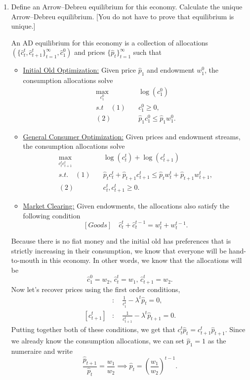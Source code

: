 \documentclass[11pt,english]{article}
\begin{document}
\begin{enumerate}
    \item[a.] Define an Arrow--Debreu equilibrium for this economy. Calculate
        the unique Arrow--Debreu equilibrium. [You do not have to prove that
        equilibrium is unique.]
    \begin{solution}
  An AD equilibrium for this economy is a collection of allocations $\left(\{\hat{c}_t^t, \hat{c}_{t+1}^t\}_{t=1}^\infty, \hat{c}_1^0\right)$ and prices $\{\hat{p}_t\}_{t=1}^\infty$ such that
\begin{itemize}
\item \underline{Initial Old Optimization:} Given price $\hat{p}_1$ and endowment $w_1^0$, the consumption allocations solve
\begin{align*}
\max_{c_1^0}&\quad \log(c_1^0)\\
s.t\quad (1)&\quad c_1^0 \geq 0,\\
(2)&\quad \hat{p}_1 c_1^0 \leq \hat{p}_1 w_1^0.
\end{align*}

\item \underline{General Consumer Optimization:} Given prices and endowment streams, the consumption allocations solve
\begin{align*}
\max_{c_t^t c_{t+1}^t}&\quad \log(c_t^t) + \log(c_{t+1}^t)\\
s.t.\quad (1)&\quad \hat{p}_t c_t^t  + \hat{p}_{t+1} c_{t+1}^t \leq \hat{p}_t w_t^t  + \hat{p}_{t+1} w_{t+1}^t,\\
(2)&\quad c_t^t, c_{t+1}^t \geq 0.
\end{align*}

\item \underline{Market Clearing:} Given endowments, the allocations also satisfy the following condition
$$[Goods]\quad \hat{c}_t^t + \hat{c}_t^{t-1} = w_t^t + w_t^{t-1}.$$
\end{itemize}

Because there is no fiat money and the initial old has preferences that is strictly increasing in their consumption, we know that everyone will be hand-to-mouth in this economy. In other words, we know that the allocations will be $$\boxed{\hat{c}_1^0 = w_2, \, \hat{c}_t^t = w_1, \, \hat{c}_{t+1}^t = w_2.}$$Now let's recover prices using the first order conditions,
\begin{align*}
[c_t^t]&:\quad \frac{1}{c_t^t} - \lambda^t\hat{p}_t = 0,\\
[c_{t+1}^t]&:\quad \frac{1}{c_{t+1}^t} - \lambda^t \hat{p}_{t+1} = 0.
\end{align*} Putting together both of these conditions, we get that $c_t^t \hat{p}_t = c_{t+1}^t \hat{p}_{t+1}$. Since we already know the consumption allocations, we can set $\hat{p}_1 = 1$ as the numeraire and write $$\frac{\hat{p}_{t+1}}{\hat{p}_t} = \frac{w_1}{w_2} \implies \boxed{\hat{p}_t = \left(\frac{w_1}{w_2}\right)^{t-1}.}$$ 
    \end{solution}
 

\end{enumerate}
\end{document}
